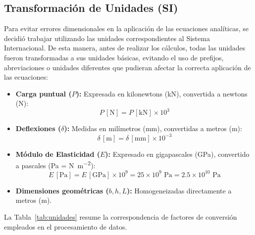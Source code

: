 \documentclass[10pt,letterpaper]{article}
\begin{document}
\subsection{Transformación de Unidades (SI)}

Para evitar errores dimensionales en la aplicación de las ecuaciones analíticas, se decidió trabajar utilizando las unidades correspondientes al Sistema Internacional. De esta manera, antes de realizar los cálculos, todas las unidades fueron transformadas a sus unidades básicas, evitando el uso de prefijos, abreviaciones o unidades diferentes que pudieran afectar la correcta aplicación de las ecuaciones:

\begin{itemize}
    \item \textbf{Carga puntual ($P$):} Expresada en kilonewtons (\si{\kilo\newton}), convertida a newtons (\si{\newton}):
    \begin{equation}
    P\,[\text{N}] = P\,[\text{kN}] \times 10^3
    \end{equation}
    \item \textbf{Deflexiones ($\delta$):} Medidas en milímetros (\si{\milli\meter}), convertidas a metros (\si{\meter}):
    \begin{equation}
    \delta\,[\text{m}] = \delta\,[\text{mm}] \times 10^{-3}
    \end{equation}
    \item \textbf{Módulo de Elasticidad ($E$):} Expresado en gigapascales (\si{\giga\pascal}), convertido a pascales (\si{\pascal} = \si{\newton\per\meter\squared}):
    \begin{equation}
    E\,[\text{Pa}] = E\,[\text{GPa}] \times 10^9 = 25 \times 10^9 \text{ Pa} = 2.5 \times 10^{10} \text{ Pa}
    \end{equation}
    \item \textbf{Dimensiones geométricas ($b, h, L$):} Homogeneizadas directamente a metros (\si{\meter}).
\end{itemize}

La Tabla~\ref{tab:unidades} resume la correspondencia de factores de conversión empleados en el procesamiento de datos.
\end{document}
